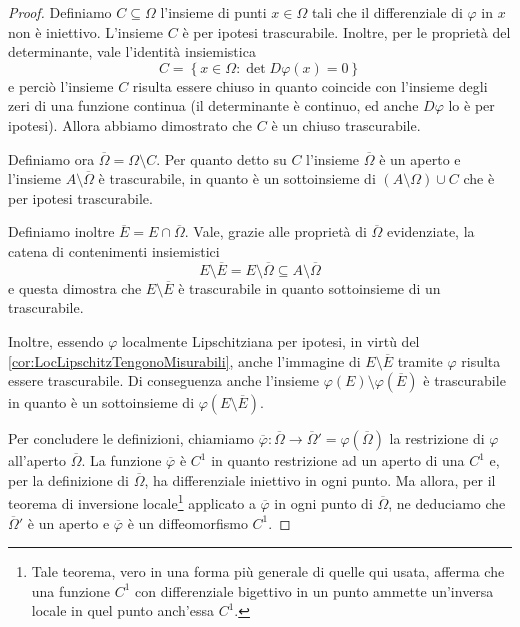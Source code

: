 \begin{proof}
	Definiamo $C\subseteq\Omega$ l'insieme di punti $x\in\Omega$ tali che il differenziale di $\varphi$ in $x$ non è iniettivo. 
	L'insieme $C$ è per ipotesi trascurabile.
	Inoltre, per le proprietà del determinante, vale l'identità insiemistica
	\begin{equation*}
		C=\left\{x\in\Omega:\det D\varphi(x)=0\right\}
	\end{equation*}
	e perciò l'insieme $C$ risulta essere chiuso in quanto coincide con l'insieme degli zeri di una funzione continua (il determinante è continuo, ed anche $D\varphi$ lo è per ipotesi).
	Allora abbiamo dimostrato che $C$ è un chiuso trascurabile.
	
	Definiamo ora $\overline\Omega=\Omega\setminus C$. 
	Per quanto detto su $C$ l'insieme $\overline\Omega$ è un aperto e l'insieme $A\setminus\overline\Omega$ è trascurabile, in quanto è un sottoinsieme di $(A\setminus\Omega)\cup C$ che è per ipotesi trascurabile.
	
	Definiamo inoltre $\overline E=E\cap\overline\Omega$. 
	Vale, grazie alle proprietà di $\overline\Omega$ evidenziate, la catena di contenimenti insiemistici
	\begin{equation*}
		E\setminus\overline E=E\setminus\overline\Omega\subseteq A\setminus\overline\Omega
	\end{equation*}
	e questa dimostra che $E\setminus\overline E$ è trascurabile in quanto sottoinsieme di un trascurabile.
	
	Inoltre, essendo $\varphi$ localmente Lipschitziana per ipotesi, in virtù del \cref{cor:LocLipschitzTengonoMisurabili}, anche l'immagine di $E\setminus\overline E$ tramite $\varphi$ risulta essere trascurabile. Di conseguenza anche l'insieme $\varphi(E)\setminus\varphi(\overline E)$ è trascurabile in quanto è un sottoinsieme di $\varphi(E\setminus\overline E)$.
	
	Per concludere le definizioni, chiamiamo $\overline\varphi:\overline\Omega\to\overline\Omega'=\varphi(\overline\Omega)$ la restrizione di $\varphi$ all'aperto $\overline\Omega$.
	La funzione $\overline\varphi$ è $C^1$ in quanto restrizione ad un aperto di una $C^1$ e, per la definizione di $\overline\Omega$, ha differenziale iniettivo in ogni punto.
	Ma allora, per il teorema di inversione locale\footnote{Tale teorema, vero in una forma più generale di quelle qui usata, afferma che una funzione $C^1$ con differenziale bigettivo in un punto ammette un'inversa locale in quel punto anch'essa $C^1$.} applicato a $\overline\varphi$ in ogni punto di $\overline\Omega$, ne deduciamo che $\overline\Omega'$ è un aperto e $\overline\varphi$ è un diffeomorfismo $C^1$.
	

\end{proof}

